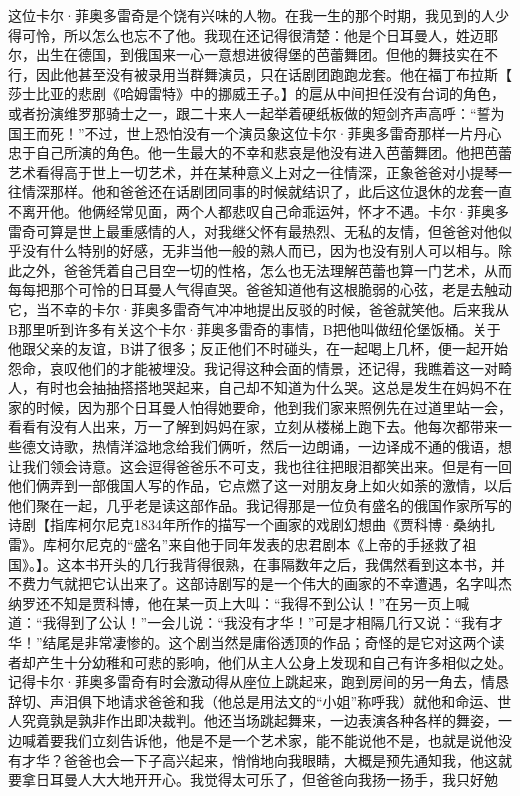 \documentclass[12pt, UTF8]{ctexbook}
\begin{document}
\par 这位卡尔·菲奥多雷奇是个饶有兴味的人物。在我一生的那个时期，我见到的人少得可怜，所以怎么也忘不了他。我现在还记得很清楚：他是个日耳曼人，姓迈耶尔，出生在德国，到俄国来一心一意想进彼得堡的芭蕾舞团。但他的舞技实在不行，因此他甚至没有被录用当群舞演员，只在话剧团跑跑龙套。他在福丁布拉斯【 莎士比亚的悲剧《哈姆雷特》中的挪威王子。】的扈从中间担任没有台词的角色，或者扮演维罗那骑士之一，跟二十来人一起举着硬纸板做的短剑齐声高呼：“誓为国王而死！”不过，世上恐怕没有一个演员象这位卡尔·菲奥多雷奇那样一片丹心忠于自己所演的角色。他一生最大的不幸和悲哀是他没有进入芭蕾舞团。他把芭蕾艺术看得高于世上一切艺术，并在某种意义上对之一往情深，正象爸爸对小提琴一往情深那样。他和爸爸还在话剧团同事的时候就结识了，此后这位退休的龙套一直不离开他。他俩经常见面，两个人都悲叹自己命乖运舛，怀才不遇。卡尔·菲奥多雷奇可算是世上最重感情的人，对我继父怀有最热烈、无私的友情，但爸爸对他似乎没有什么特别的好感，无非当他一般的熟人而已，因为也没有别人可以相与。除此之外，爸爸凭着自己目空一切的性格，怎么也无法理解芭蕾也算一门艺术，从而每每把那个可怜的日耳曼人气得直哭。爸爸知道他有这根脆弱的心弦，老是去触动它，当不幸的卡尔·菲奥多雷奇气冲冲地提出反驳的时候，爸爸就笑他。后来我从B那里听到许多有关这个卡尔·菲奥多雷奇的事情，B把他叫做纽伦堡饭桶。关于他跟父亲的友谊，B讲了很多；反正他们不时碰头，在一起喝上几杯，便一起开始怨命，哀叹他们的才能被埋没。我记得这种会面的情景，还记得，我瞧着这一对畸人，有时也会抽抽搭搭地哭起来，自己却不知道为什么哭。这总是发生在妈妈不在家的时候，因为那个日耳曼人怕得她要命，他到我们家来照例先在过道里站一会，看看有没有人出来，万一了解到妈妈在家，立刻从楼梯上跑下去。他每次都带来一些德文诗歌，热情洋溢地念给我们俩听，然后一边朗诵，一边译成不通的俄语，想让我们领会诗意。这会逗得爸爸乐不可支，我也往往把眼泪都笑出来。但是有一回他们俩弄到一部俄国人写的作品，它点燃了这一对朋友身上如火如荼的激情，以后他们聚在一起，几乎老是读这部作品。我记得那是一位负有盛名的俄国作家所写的诗剧【指库柯尔尼克1834年所作的描写一个画家的戏剧幻想曲《贾科博·桑纳扎雷》。库柯尔尼克的“盛名”来自他于同年发表的忠君剧本《上帝的手拯救了祖国》。】。这本书开头的几行我背得很熟，在事隔数年之后，我偶然看到这本书，并不费力气就把它认出来了。这部诗剧写的是一个伟大的画家的不幸遭遇，名字叫杰纳罗还不知是贾科博，他在某一页上大叫：“我得不到公认！”在另一页上喊道：“我得到了公认！”一会儿说：“我没有才华！”可是才相隔几行又说：“我有才华！”结尾是非常凄惨的。这个剧当然是庸俗透顶的作品；奇怪的是它对这两个读者却产生十分幼稚和可悲的影响，他们从主人公身上发现和自己有许多相似之处。记得卡尔·菲奥多雷奇有时会激动得从座位上跳起来，跑到房间的另一角去，情恳辞切、声泪俱下地请求爸爸和我（他总是用法文的“小姐”称呼我）就他和命运、世人究竟孰是孰非作出即决裁判。他还当场跳起舞来，一边表演各种各样的舞姿，一边喊着要我们立刻告诉他，他是不是一个艺术家，能不能说他不是，也就是说他没有才华？爸爸也会一下子高兴起来，悄悄地向我眼睛，大概是预先通知我，他这就要拿日耳曼人大大地开开心。我觉得太可乐了，但爸爸向我扬一扬手，我只好勉
\end{document}
